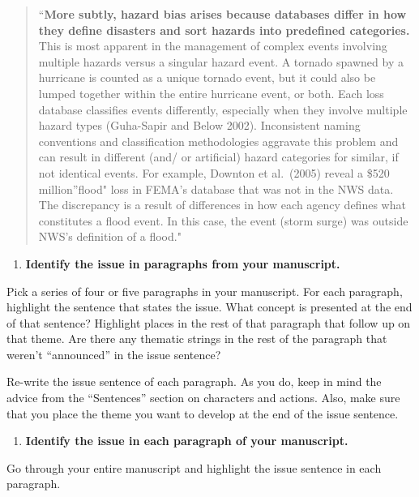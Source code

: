 \documentclass[]{tufte-book}
\providecommand{\tightlist}{%
  \setlength{\itemsep}{0pt}\setlength{\parskip}{0pt}}
\begin{document}
\begin{quote}
``\textbf{More subtly, hazard bias arises because databases differ in how
they define disasters and sort hazards into predefined categories.} This is
most apparent in the management of complex events involving multiple hazards
versus a singular hazard event. A tornado spawned by a hurricane is counted as a
unique tornado event, but it could also be lumped together within the entire
hurricane event, or both. Each loss database classifies events differently,
especially when they involve multiple hazard types (Guha-Sapir and Below 2002).
Inconsistent naming conventions and classification methodologies aggravate this
problem and can result in different (and/ or artificial) hazard categories for
similar, if not identical events. For example, Downton et al.~(2005) reveal a
\$520 million''flood" loss in FEMA's database that was not in the NWS data. The
discrepancy is a result of differences in how each agency defines what
constitutes a flood event. In this case, the event (storm surge) was outside
NWS's definition of a flood."
\end{quote}

\begin{enumerate}
\def\labelenumi{\arabic{enumi}.}
\setcounter{enumi}{4}
\tightlist
\item
  \textbf{Identify the issue in paragraphs from your manuscript.}
\end{enumerate}

Pick a series of four or five paragraphs in your manuscript. For each paragraph,
highlight the sentence that states the issue. What concept is presented at the end
of that sentence? Highlight places in the rest of that paragraph that
follow up on that theme. Are there any thematic strings in the rest of the
paragraph that weren't ``announced'' in the issue sentence?

Re-write the issue sentence of each paragraph. As you do, keep in mind the
advice from the ``Sentences'' section on characters and actions. Also, make sure
that you place the theme you want to develop at the end of the issue sentence.

\begin{enumerate}
\def\labelenumi{\arabic{enumi}.}
\setcounter{enumi}{5}
\tightlist
\item
  \textbf{Identify the issue in each paragraph of your manuscript.}
\end{enumerate}

Go through your entire manuscript and highlight the issue sentence in each
paragraph.
\end{document}
